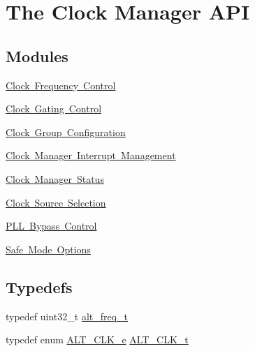 \hypertarget{group__CLK__MGR}{}\section{The Clock Manager A\+PI}
\label{group__CLK__MGR}
\subsection*{Modules}
\begin{DoxyCompactItemize}
\item 
\mbox{\hyperlink{group__CLK__MGR__FREQ}{Clock Frequency Control}}
\item 
\mbox{\hyperlink{group__CLK__MGR__GATE}{Clock Gating Control}}
\item 
\mbox{\hyperlink{group__CLK__MGR__GROUP__CFG}{Clock Group Configuration}}
\item 
\mbox{\hyperlink{group__CLK__MGR__INT}{Clock Manager Interrupt Management}}
\item 
\mbox{\hyperlink{group__CLK__MGR__STATUS}{Clock Manager Status}}
\item 
\mbox{\hyperlink{group__CLK__MGR__CLK__SEL}{Clock Source Selection}}
\item 
\mbox{\hyperlink{group__CLK__MGR__BYPASS}{P\+L\+L Bypass Control}}
\item 
\mbox{\hyperlink{group__CLK__MGR__SAFE__MODE}{Safe Mode Options}}
\end{DoxyCompactItemize}
\subsection*{Typedefs}
\begin{DoxyCompactItemize}
\item 
typedef uint32\+\_\+t \mbox{\hyperlink{group__CLK__MGR_gaa32fe6dfaa6def16098e0039eb336383}{alt\+\_\+freq\+\_\+t}}
\item 
typedef enum \mbox{\hyperlink{group__CLK__MGR_ga931510957187a22cb4e6adef8d9d105a}{A\+L\+T\+\_\+\+C\+L\+K\+\_\+e}} \mbox{\hyperlink{group__CLK__MGR_ga4cdb80e84284365fe3d47c2f8050b13d}{A\+L\+T\+\_\+\+C\+L\+K\+\_\+t}}
\end{DoxyCompactItemize}
